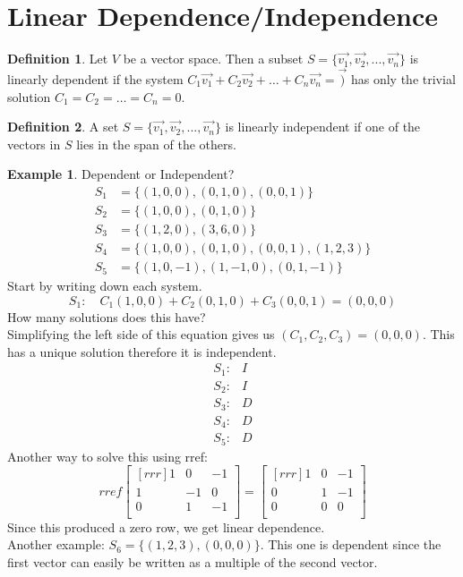 \documentclass{report}
\theoremstyle{plain}
\theoremstyle{definition}
\newtheorem*{ex}{Example}
\newtheorem*{defn}{Definition}
\theoremstyle{plain}
\begin{document}
\section{Linear Dependence/Independence}
\begin{defn}
Let $V$ be a vector space. Then a subset $S=\{\vec{v_1},\vec{v_2},...,\vec{v_n}\}$ is linearly dependent if the system $C_1\vec{v_1}+C_2\vec{v_2}+\dots+C_n\vec{v_n} = \vec{)}$ has only the trivial solution $C_1 = C_2 = \dots = C_n = 0$.
\end{defn}
\begin{defn}
A set $S=\{\vec{v_1},\vec{v_2},...,\vec{v_n}\}$ is linearly independent if one of the vectors in $S$ lies in the span of the others.
\end{defn}
\begin{ex}
Dependent or Independent?\\
\begin{align*}
S_1&=\{(1,0,0),(0,1,0),(0,0,1)\}\\
S_2&=\{(1,0,0),(0,1,0)\}\\
S_3&=\{(1,2,0),(3,6,0)\}\\
S_4&=\{(1,0,0),(0,1,0),(0,0,1),(1,2,3)\}\\
S_5&=\{(1,0,-1),(1,-1,0),(0,1,-1)\}
\end{align*}
Start by writing down each system.
\[ S_1: \quad C_1(1,0,0)+C_2(0,1,0)+C_3(0,0,1)=(0,0,0) \]
How many solutions does this have?\\
Simplifying the left side of this equation gives us $(C_1,C_2,C_3)=(0,0,0)$. This has a unique solution therefore it is independent.
\begin{align*}
S_1: &I\\ S_2: &I\\ S_3: &D\\ S_4: &D\\ S_5: &D
\end{align*}
Another way to solve this using rref:
\[ rref \begin{bmatrix}[rrr]1&0&-1\\1&-1&0\\0&1&-1\\ \end{bmatrix} = \begin{bmatrix}[rrr] 1&0&-1\\0&1&-1\\0&0&0\\ \end{bmatrix} \]
Since this produced a zero row, we get linear dependence.\\
Another example: $S_6=\{(1,2,3),(0,0,0)\}$. This one is dependent since the first vector can easily be written as a multiple of the second vector.
\end{ex}
\end{document}
